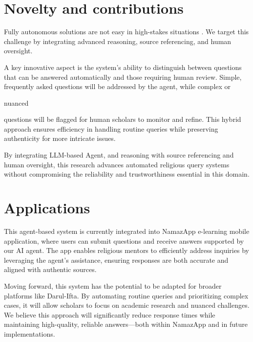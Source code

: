 



\section{Novelty and contributions}
\label{sec:section}
Fully autonomous solutions are not easy in high-stakes situations \cite{budler2023review}. We target this challenge by integrating advanced reasoning, source referencing, and human oversight. 

A key innovative aspect is the system's ability to distinguish between questions that can be answered automatically and those requiring human review. Simple, frequently asked questions will be addressed by the agent, while complex or  nuanced questions will be flagged for human scholars to monitor and refine. This hybrid approach ensures efficiency in handling routine queries while preserving authenticity for more intricate issues.


By integrating LLM-based Agent, and reasoning with source referencing and human oversight, this research advances automated religious query systems without compromising the reliability and trustworthiness essential in this domain.

\section{Applications}
\label{sec:section}
This agent-based system is currently integrated into NamazApp e-learning mobile application, where users can submit questions and receive answers supported by our AI agent. The app enables religious mentors to efficiently address inquiries by leveraging the agent’s assistance, ensuring responses are both accurate and aligned with authentic sources.

Moving forward, this system has the potential to be adapted for broader platforms like Darul-Ifta. By automating routine queries and prioritizing complex cases, it will allow scholars to focus on academic research and nuanced challenges. We believe this approach will significantly reduce response times while maintaining high-quality, reliable answers—both within NamazApp and in future implementations.

